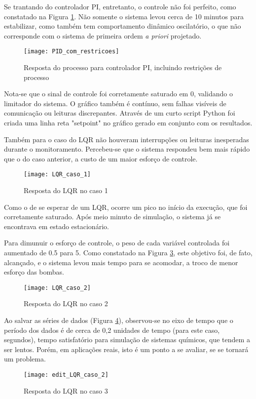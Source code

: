 Se trantando do controlador PI, entretanto, o controle não foi perfeito, como constatado na Figura \ref{img_pid_com_restricoes}. Não somente o sistema levou cerca de 10 minutos para estabilizar, como também tem comportamento dinâmico oscilatório, o que não corresponde com o sistema de primeira ordem \emph{a priori} projetado.

\begin{figure}[htb]
	\centering
	\caption{Resposta do processo para controlador PI, incluindo restrições de processo}
	\texttt{[image: PID\_com\_restricoes]}
	\label{img_pid_com_restricoes}
\end{figure}

Nota-se que o sinal de controle foi corretamente saturado em 0, validando o limitador do sistema. O gráfico também é contínuo, sem falhas visíveis de comunicação ou leituras discrepantes. Através de um curto script Python foi criada uma linha reta "setpoint" no gráfico gerado em conjunto com os resultados.

Também para o caso do LQR não houveram interrupções ou leituras inesperadas durante o monitoramento. Percebeu-se que o sistema respondeu bem mais rápido que o do caso anterior, a custo de um maior esforço de controle.

\begin{figure}[htb]
	\centering
	\caption{Resposta do LQR no caso 1}
	\texttt{[image: LQR\_caso\_1]}
	\label{img_lqr_caso_1}
\end{figure}

Como o de se esperar de um LQR, ocorre um pico no início da execução, que foi corretamente saturado. Após meio minuto de simulação, o sistema já se encontrava em estado estacionário.

Para dimunuir o esforço de controle, o peso de cada variável controlada foi aumentado de 0.5 para 5. Como constatado na Figura \ref{img_lqr_caso_2}, este objetivo foi, de fato, alcançado, e o sistema levou mais tempo para se acomodar, a troco de menor esforço das bombas.

\begin{figure}[htb]
	\centering
	\caption{Resposta do LQR no caso 2}
	\texttt{[image: LQR\_caso\_2]}
	\label{img_lqr_caso_2}
\end{figure}

Ao salvar as séries de dados (Figura \ref{img_edit_lqr_caso_2}), observou-se no eixo de tempo que o período dos dados é de cerca de 0,2 unidades de tempo (para este caso, segundos), tempo satisfatório para simulação de sistemas químicos, que tendem a ser lentos. Porém, em aplicações reais, isto é um ponto a se avaliar, se se tornará um problema.

\begin{figure}[htb]
	\centering
	\caption{Resposta do LQR no caso 3}
	\texttt{[image: edit\_LQR\_caso\_2]}
	\label{img_edit_lqr_caso_2}
\end{figure}